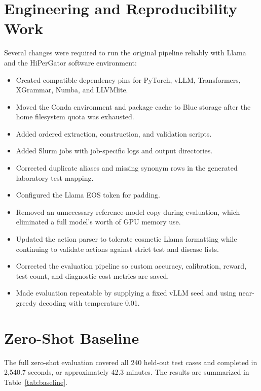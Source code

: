 \documentclass[11pt]{article}
\begin{document}
\section{Engineering and Reproducibility Work}

Several changes were required to run the original pipeline reliably with
Llama and the HiPerGator software environment:

\begin{itemize}
    \item Created compatible dependency pins for PyTorch, vLLM, Transformers,
          XGrammar, Numba, and LLVMlite.
    \item Moved the Conda environment and package cache to Blue storage after
          the home filesystem quota was exhausted.
    \item Added ordered extraction, construction, and validation scripts.
    \item Added Slurm jobs with job-specific logs and output directories.
    \item Corrected duplicate aliases and missing synonym rows in the generated
          laboratory-test mapping.
    \item Configured the Llama EOS token for padding.
    \item Removed an unnecessary reference-model copy during evaluation, which
          eliminated a full model's worth of GPU memory use.
    \item Updated the action parser to tolerate cosmetic Llama formatting while
          continuing to validate actions against strict test and disease lists.
    \item Corrected the evaluation pipeline so custom accuracy, calibration,
          reward, test-count, and diagnostic-cost metrics are saved.
    \item Made evaluation repeatable by supplying a fixed vLLM seed and using
          near-greedy decoding with temperature 0.01.
\end{itemize}

\section{Zero-Shot Baseline}

The full zero-shot evaluation covered all 240 held-out test cases and completed
in 2,540.7 seconds, or approximately 42.3 minutes. The results are summarized
in Table~\ref{tab:baseline}.
\end{document}

